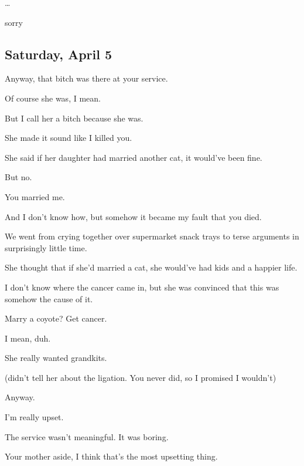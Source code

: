 {
\ldots{}

sorry

\newpage

\subsection*{Saturday, April 5}\label{saturday-april-5}

Anyway, that bitch was there at
your service.

Of course she was, I mean.

But I call her a bitch because she
was.

She made it sound like I killed
you.

She said if her daughter had
married another cat, it would've been fine.

But no.

You married me.

And I don't know how, but somehow
it became my fault that you died.

We went from crying together over
supermarket snack trays to terse arguments in surprisingly little time.

She thought that if she'd married a
cat, she would've had kids and a happier life.

I don't know where the cancer came
in, but she was convinced that this was somehow the cause of it.

Marry a coyote? Get cancer.

I mean, duh.

She really wanted grandkits.

(didn't tell her about the
ligation. You never did, so I promised I wouldn't)

Anyway.

I'm really upset.

The service wasn't meaningful. It
was boring.

Your mother aside, I think that's
the most upsetting thing.

}
